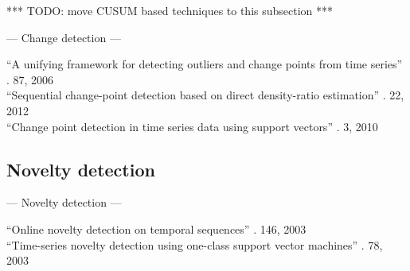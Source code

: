 *** TODO: move CUSUM based techniques to this subsection ***


--- Change detection ---

``A unifying framework for detecting outliers and change points from time series'' \cite{takeuchi2006unifying}. 87, 2006 \\







``Sequential change-point detection based on direct density-ratio estimation'' \cite{kawahara2012sequential}. 22, 2012 \\

``Change point detection in time series data using support vectors'' \cite{camci2010change}. 3, 2010 \\

\subsection{Novelty detection}\label{subsec:novelty_detection}

--- Novelty detection ---

``Online novelty detection on temporal sequences'' \cite{ma2003online}. 146, 2003 \\
``Time-series novelty detection using one-class support vector machines'' \cite{ma2003time}. 78, 2003 \\

